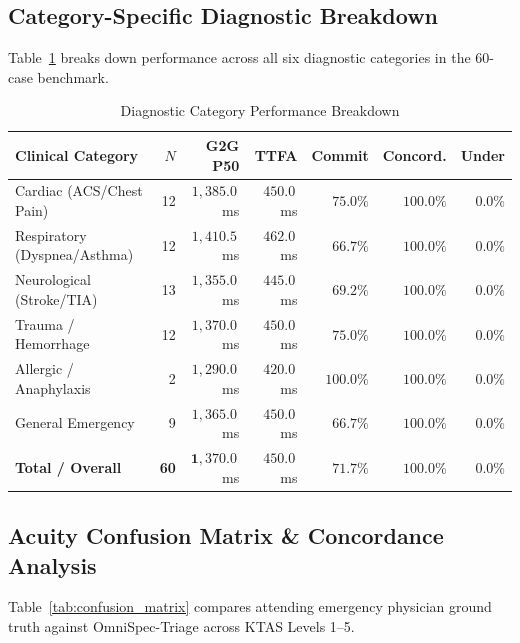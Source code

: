 \documentclass[10pt,journal,compsoc]{IEEEtran}
\begin{document}
\subsection{Category-Specific Diagnostic Breakdown}
Table~\ref{tab:category_breakdown} breaks down performance across all six diagnostic categories in the 60-case benchmark.

\begin{table}[!t]
\centering
\caption{Diagnostic Category Performance Breakdown}
\label{tab:category_breakdown}
\footnotesize
\setlength{\tabcolsep}{3pt}
\begin{tabularx}{\columnwidth}{@{}lrrrrrr@{}}
\toprule
\textbf{Clinical Category} & \textbf{$N$} & \textbf{G2G P50} & \textbf{TTFA} & \textbf{Commit} & \textbf{Concord.} & \textbf{Under} \\
\midrule
Cardiac (ACS/Chest Pain) & 12 & $1{,}385.0$\,ms & $450.0$\,ms & $75.0\%$ & $100.0\%$ & $0.0\%$ \\
Respiratory (Dyspnea/Asthma) & 12 & $1{,}410.5$\,ms & $462.0$\,ms & $66.7\%$ & $100.0\%$ & $0.0\%$ \\
Neurological (Stroke/TIA) & 13 & $1{,}355.0$\,ms & $445.0$\,ms & $69.2\%$ & $100.0\%$ & $0.0\%$ \\
Trauma / Hemorrhage & 12 & $1{,}370.0$\,ms & $450.0$\,ms & $75.0\%$ & $100.0\%$ & $0.0\%$ \\
Allergic / Anaphylaxis & 2 & $1{,}290.0$\,ms & $420.0$\,ms & $100.0\%$ & $100.0\%$ & $0.0\%$ \\
General Emergency & 9 & $1{,}365.0$\,ms & $450.0$\,ms & $66.7\%$ & $100.0\%$ & $0.0\%$ \\
\midrule
\textbf{Total / Overall} & \textbf{60} & $\mathbf{1{,}370.0}$\,ms & $\mathbf{450.0}$\,ms & $\mathbf{71.7\%}$ & $\mathbf{100.0\%}$ & $\mathbf{0.0\%}$ \\
\bottomrule
\end{tabularx}
\end{table}

\subsection{Acuity Confusion Matrix \& Concordance Analysis}
Table~\ref{tab:confusion_matrix} compares attending emergency physician ground truth against OmniSpec-Triage across KTAS Levels 1--5.
\end{document}
